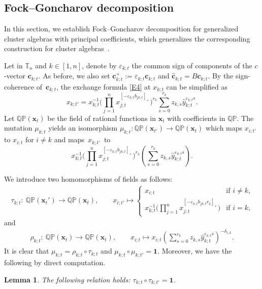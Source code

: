 \documentclass[pdftex]{sigma}
\newcommand{\id}{\mathbf{1}}
\numberwithin{equation}{section}
\newtheorem{Lemma}[Theorem]{Lemma}
\begin{document}
\subsection{Fock--Goncharov decomposition}\label{S3}
In this section, we establish Fock--Goncharov decomposition for generalized cluster algebras with principal coefficients, which generalizes the corresponding construction for cluster algebras~\mbox{\cite{fock2009,nakanishi2023}}.



Let  in $\mathbb{T}_n$ and $k\in [1,n]$, denote by $\varepsilon_{k;t}$ the common sign of components of the $c$-vector $\mathbf{c}_{k;t}$. As before, we also set $\mathbf{c}_{k;t}^+:=\varepsilon_{k;t}\mathbf{c}_{k;t}$ and $\mathbf{\hat{c}}_{k;t}=B\mathbf{c}_{k;t}$. By the sign-coherence of~$\mathbf{c}_{k;t}$, the exchange formula \eqref{E4} at $x_{k;t}$ can be simplified as
\[
x_{k;t'}=x_{k;t}^{-1}\Biggl(\prod\limits_{j=1}^{n}x_{j;t}^{[-\varepsilon_{k;t} b_{jk;t}]_+}\Biggr)^{r_k}\sum\limits_{s=0}^{r_k}z_{k,s}\hat{y}_{k;t}^{\varepsilon_{k;t} s}.
\]
Let $\mathbb{Q}\mathbb{P}(\mathbf{x}_t)$ be the field of rational functions in $\mathbf{x}_t$ with coefficients in $\mathbb{Q}\mathbb{P}$. The mutation $\mu_{k;t}$ yields an isomorphism $\mu_{k;t}\colon\mathbb{Q}\mathbb{P}(\mathbf{x}_{t'})\to \mathbb{Q}\mathbb{P}(\mathbf{x}_t)$ which maps $x_{i;t'}$ to $x_{i;t}$ for $i\neq k$ and maps~$x_{k;t'}$~to
\[
x_{k;t}^{-1}\Biggl(\prod\limits_{j=1}^{n}x_{j;t}^{[-\varepsilon_{k;t} b_{jk;t}]_+}\Biggr)^{r_k}\left(\sum\limits_{s=0}^{r_k}z_{k,s}\hat{y}_{k;t}^{\varepsilon_{k;t} s}\right).
\]


 We introduce two homomorphisms of fields as follows:
\begin{align*}
 \tau_{k;t}\colon\ \mathbb{QP}(\mathbf{x}_t')\longrightarrow\mathbb{QP}(\mathbf{x}_t),\qquad
 x_{i;t'}\mapsto
 \begin{cases}
 x_{i;t} & \text{if $i\neq k$,}\\
 \displaystyle x_{k;t}^{-1}\biggl(\prod\limits_{j=1}^{n}x_{j;t}^{[-\varepsilon_{k;t}b_{jk;t}r_k]_+}\biggr) & \text{if $i=k$,}
 \end{cases}
 \end{align*} and
 \begin{align*}
 \rho_{k;t}\colon\ \mathbb{QP}(\mathbf{x}_t)\longrightarrow\mathbb{QP}(\mathbf{x}_t),\qquad
 x_{i;t}\mapsto x_{i;t}\left(\sum\limits_{s=0}^{r_k}z_{k,s}\hat{y}^{\varepsilon_{k;t}s}_{k;t}\right)^{-\delta_{i,k}}.
 \end{align*}
It is clear that $\mu_{k;t}=\rho_{k;t}\circ\tau_{k;t}$ and $\mu_{k;t}\circ\mu_{k;t'}=\id$. Moreover, we have the following by direct computation.
\begin{Lemma}\label{P8}
 The following relation holds:
$
 \tau_{k;t}\circ\tau_{k;t'}=\id$.
\end{Lemma}
\end{document}
